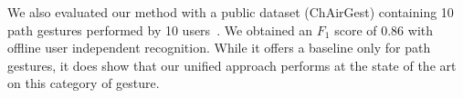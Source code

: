 \documentclass[conference]{IEEEtran}
\begin{document}
We also evaluated our method
with a public dataset (ChAirGest) containing 10 path gestures performed by 10
users~\cite{yin13}. We obtained an $F_1$ score of 0.86 with
offline user independent recognition. While it
offers a baseline only for path gestures, it does show that our unified approach
performs at the state of the art on this category of gesture.

%
%



%
%

\end{document}
